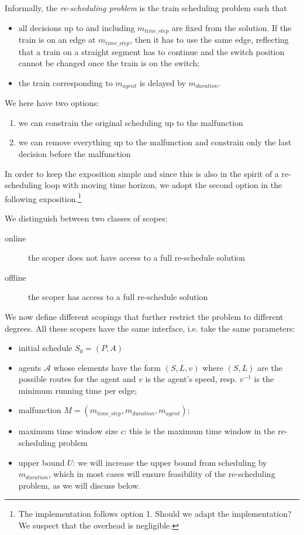 \documentclass{article}
\begin{document}
Informally, the \emph{re-scheduling problem} is the train scheduling problem such that
\begin{itemize}
    \item all decisions up to and including $m_{time\_step}$ are fixed from the solution. If the train is on an edge at $m_{time\_step}$, then it has to use the same edge, reflecting that a train on a straight segment has to continue and the switch position cannot be changed once the train is on the switch;
    \item the train corresponding to $m_{agent}$ is delayed by $m_{duration}$.
\end{itemize}
We here have two options:
\begin{enumerate}
    \item we can constrain the original scheduling up to the malfunction
    \item we can remove everything up to the malfunction and constrain only the last decision before the malfunction
\end{enumerate}
In order to keep the exposition simple and since this is also in the spirit of a re-scheduling loop with moving time horizon, we adopt the second option in the following exposition.\footnote{The implementation follows option 1. Should we adapt the implementation? We suspect that the overhead is negligible.}

We distinguish between two classes of scopes:
\begin{description}
\item[online] the scoper does not have access to a full re-schedule solution
\item[offline] the scoper has access to a full re-schedule solution
\end{description}

We now define different scopings that further restrict the problem to different degrees. All these scopers have the same interface, i.e. take the same parameters:
\begin{itemize}
    \item initial schedule $S_0=(P,A)$
    \item agents $\mathcal{A}$ whose elements have the form $(S,L,v)$ where $(S,L)$ are the possible routes for the agent and $v$ is the agent's speed, resp. $v^{-1}$ is the minimum running time per edge;
    \item malfunction $M=(m_{time\_step},m_{duration},m_{agent})$;
    \item maximum time window size $c$: this is the maximum time window in the re-scheduling problem
    \item upper bound $U$: we will increase the upper bound from scheduling by $m_{duration}$, which in most cases will ensure feasibility of the re-scheduling problem, as we will discuss below.
\end{itemize}
\end{document}

